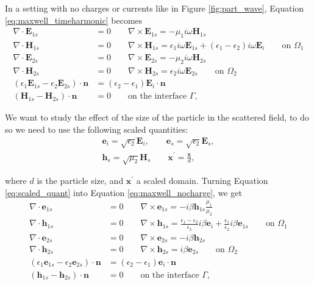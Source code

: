 In a setting with no charges or currents like in Figure \ref{fig:part_wave}, Equation \eqref{eq:maxwell_timeharmonic} becomes
 \begin{align} \label{eq:maxwell_nocharge}
 \nabla \cdot \mathbf{E}_{1s} &= 0 \qquad \nabla \times \mathbf{E}_{1s} = -\mu_1i\omega\mathbf{H}_{1s} \nonumber \\
 \nabla \cdot \mathbf{H}_{1s} &= 0 \qquad \nabla \times \mathbf{H}_{1s} = \epsilon_1i\omega\mathbf{E}_{1s} + (\epsilon_1-\epsilon_2)i\omega\mathbf{E}_{i} \qquad \text{on $\Omega_1$} \nonumber \\
 \nabla \cdot \mathbf{E}_{2s} &= 0 \qquad \nabla \times \mathbf{E}_{2s} = -\mu_2i\omega\mathbf{H}_{2s} \nonumber \\
 \nabla \cdot \mathbf{H}_{2s} &= 0 \qquad \nabla \times \mathbf{H}_{2s} = \epsilon_2i\omega\mathbf{E}_{2s} \qquad \text{on $\Omega_2$} \nonumber \\
 (\epsilon_1\mathbf{E}_{1s} - \epsilon_2\mathbf{E}_{2s})\cdot\mathbf{n} &= (\epsilon_2-\epsilon_1)\mathbf{E}_i\cdot \mathbf{n} \nonumber \\(\mathbf{H}_{1s} - \mathbf{H}_{2s})\cdot \mathbf{n}&=0 \qquad \text{on the interface $\Gamma$,}
 \end{align}
 
 We want to study the effect of the size of the particle in the scattered field, to do so we need 
 to use the following scaled quantities:
 \begin{align}\label{eq:scaled_quant}
 \mathbf{e}_i = \sqrt{\epsilon_2}\mathbf{E}_i, \qquad \mathbf{e}_s = \sqrt{\epsilon_2}\mathbf{E}_s, \nonumber \\
 \mathbf{h}_s = \sqrt{\mu_2}\mathbf{H}_s \qquad \mathbf{x}^\prime = \frac{\mathbf{x}}{d},
 \end{align}
 
 where $d$ is the particle size, and $\mathbf{x}^\prime$ a scaled domain. Turning
 Equation \eqref{eq:scaled_quant} into Equation \eqref{eq:maxwell_nocharge}, we get
 \begin{align} \label{eq:maxwell_scaled}
 \nabla \cdot \mathbf{e}_{1s} &= 0 \qquad \nabla \times \mathbf{e}_{1s} = -i\beta\mathbf{h}_{1s}\frac{\mu_1}{\mu_2} \nonumber \\
 \nabla \cdot \mathbf{h}_{1s} &= 0 \qquad \nabla \times \mathbf{h}_{1s} = \frac{\epsilon_1-\epsilon_2}{\epsilon_2}i\beta\mathbf{e}_{i}+\frac{\epsilon_1}{\epsilon_2}i\beta\mathbf{e}_{1s}  \qquad \text{on $\Omega_1$} \nonumber \\
 \nabla \cdot \mathbf{e}_{2s} &= 0 \qquad \nabla \times \mathbf{e}_{2s} = -i\beta\mathbf{h}_{2s} \nonumber \\
 \nabla \cdot \mathbf{h}_{2s} &= 0 \qquad \nabla \times \mathbf{h}_{2s} = i\beta\mathbf{e}_{2s} \qquad \text{on $\Omega_2$} \nonumber \\
 (\epsilon_1\mathbf{e}_{1s} - \epsilon_2\mathbf{e}_{2s})\cdot\mathbf{n} &= (\epsilon_2-\epsilon_1)\mathbf{e}_i\cdot \mathbf{n} \nonumber \\(\mathbf{h}_{1s} - \mathbf{h}_{2s})\cdot \mathbf{n}&=0 \qquad \text{on the interface $\Gamma$,}
 \end{align}
 
